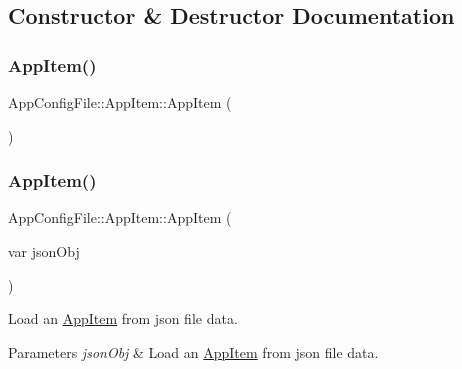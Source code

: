 \subsection{Constructor \& Destructor Documentation}
\mbox{\label{structAppConfigFile_1_1AppItem_a89719db20b034986d64a0dd294dac1a8}} 
\subsubsection{\texorpdfstring{App\+Item()}{AppItem()}\hspace{0.1cm}{\footnotesize\ttfamily [1/2]}}
{\footnotesize\ttfamily App\+Config\+File\+::\+App\+Item\+::\+App\+Item (\begin{DoxyParamCaption}{ }\end{DoxyParamCaption})\hspace{0.3cm}{\ttfamily [inline]}}

\mbox{\label{structAppConfigFile_1_1AppItem_a13b53e6a54c637e25c398d9d0d671a44}} 
\subsubsection{\texorpdfstring{App\+Item()}{AppItem()}\hspace{0.1cm}{\footnotesize\ttfamily [2/2]}}
{\footnotesize\ttfamily App\+Config\+File\+::\+App\+Item\+::\+App\+Item (\begin{DoxyParamCaption}\item[{var}]{json\+Obj }\end{DoxyParamCaption})}

Load an \mbox{\hyperlink{structAppConfigFile_1_1AppItem}{App\+Item}} from json file data.


\begin{DoxyParams}{Parameters}
{\em json\+Obj} & Load an \mbox{\hyperlink{structAppConfigFile_1_1AppItem}{App\+Item}} from json file data. \\
\hline
\end{DoxyParams}


